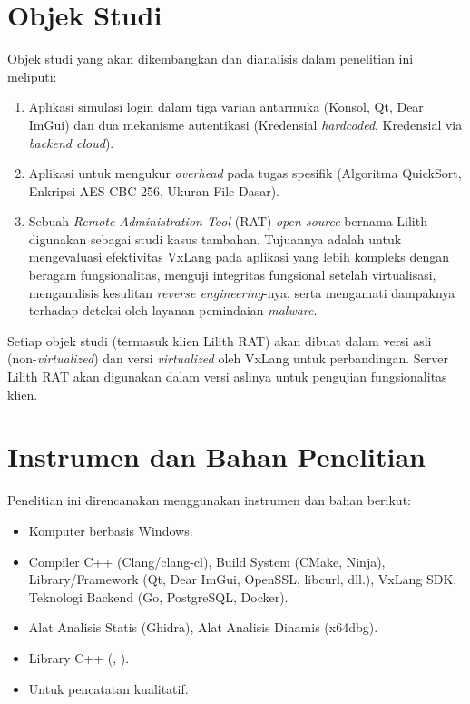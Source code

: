 \section{Objek Studi}
Objek studi yang akan dikembangkan dan dianalisis dalam penelitian ini meliputi:
\begin{enumerate}
    \item {} Aplikasi simulasi login dalam tiga varian antarmuka (Konsol, Qt, Dear ImGui) dan dua mekanisme autentikasi (Kredensial \textit{hardcoded}, Kredensial via \textit{backend cloud}).
    \item {} Aplikasi untuk mengukur \textit{overhead} pada tugas spesifik (Algoritma QuickSort, Enkripsi AES-CBC-256, Ukuran File Dasar).
    \item {} Sebuah \textit{Remote Administration Tool} (RAT) \textit{open-source} bernama Lilith \cite{LilithRAT} digunakan sebagai studi kasus tambahan. Tujuannya adalah untuk mengevaluasi efektivitas VxLang pada aplikasi yang lebih kompleks dengan beragam fungsionalitas, menguji integritas fungsional setelah virtualisasi, menganalisis kesulitan \textit{reverse engineering}-nya, serta mengamati dampaknya terhadap deteksi oleh layanan pemindaian \textit{malware}.
\end{enumerate}
Setiap objek studi (termasuk klien Lilith RAT) akan dibuat dalam versi asli (non-\textit{virtualized}) dan versi \textit{virtualized} oleh VxLang untuk perbandingan. Server Lilith RAT akan digunakan dalam versi aslinya untuk pengujian fungsionalitas klien.

\section{Instrumen dan Bahan Penelitian}
Penelitian ini direncanakan menggunakan instrumen dan bahan berikut:
\begin{itemize}
    \item {} Komputer berbasis Windows.
    \item {} Compiler C++ (Clang/clang-cl), Build System (CMake, Ninja), Library/Framework (Qt, Dear ImGui, OpenSSL, libcurl, dll.), VxLang SDK, Teknologi Backend (Go, PostgreSQL, Docker).
    \item {} Alat Analisis Statis (Ghidra), Alat Analisis Dinamis (x64dbg).
    \item {} Library C++ (, ).
    \item {} Untuk pencatatan kualitatif.
\end{itemize}

